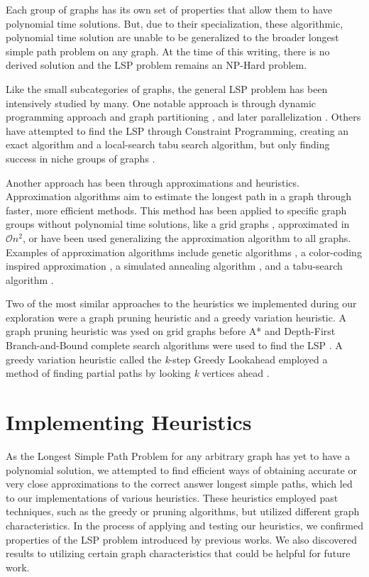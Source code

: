 \documentclass[twocolumn,showpacs,%
  nofootinbib,aps,superscriptaddress,%
  eqsecnum,prd,notitlepage,showkeys,11pt]{article}
\begin{document}
Each group of graphs has its own set of properties that allow them to have polynomial time solutions. But, due to their specialization, these algorithmic, polynomial time solution are unable to be generalized to the broader longest simple path problem on any graph. At the time of this writing, there is no derived solution and the LSP problem remains an NP-Hard problem. 

Like the small subcategories of graphs, the general LSP problem has been intensively studied by many. One notable approach is through dynamic programming approach and graph partitioning \cite{balyo2017optimal}, and later parallelization \cite{fieger2019finding}. Others have attempted to find the LSP through Constraint Programming, creating an exact algorithm and a local-search tabu search algorithm, but only finding success in niche groups of graphs \cite{pham2012solving}.

Another approach has been through approximations and heuristics. Approximation algorithms aim to estimate the longest path in a graph through faster, more efficient methods. This method has been applied to specific graph groups without polynomial time solutions, like a grid graphs \cite{zhang2011approximating}, approximated in $\mathcal{O}{n^2}$, or have been used generalizing the approximation algorithm to all graphs. Examples of approximation algorithms include genetic algorithms \cite{mathew2012genetic, portugal2010study, scholvin1999approximating}, a color-coding \cite{alon1995color} inspired approximation \cite{scutella2003approximation}, a simulated annealing algorithm \cite{scholvin1999approximating}, and a tabu-search algorithm \cite{scholvin1999approximating}.

Two of the most similar approaches to the heuristics we implemented during our exploration were a graph pruning heuristic and a greedy variation heuristic. A graph pruning heuristic was ysed on grid graphs before A* and Depth-First Branch-and-Bound complete search algorithms were used to find the LSP \cite{cohen2020solving}. A greedy variation heuristic called the \emph{k}-step Greedy Lookahead employed a method of finding partial paths by looking \emph{k} vertices ahead \cite{scholvin1999approximating}.

\section{\centering Implementing Heuristics}
As the Longest Simple Path Problem for any arbitrary graph has yet to have a polynomial solution, we attempted to find efficient ways of obtaining accurate or very close approximations to the correct answer longest simple paths, which led to our implementations of various heuristics. These heuristics employed past techniques, such as the greedy or pruning algorithms, but utilized different graph characteristics. In the process of applying and testing our heuristics, we confirmed properties of the LSP problem introduced by previous works. We also discovered results to utilizing certain graph characteristics that could be helpful for future work.
\end{document}
